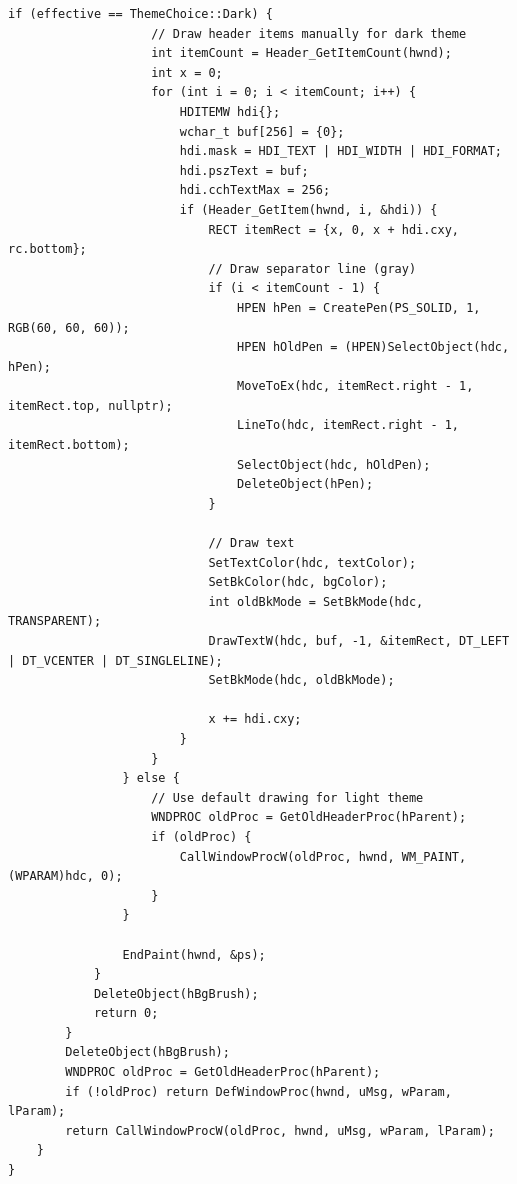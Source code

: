 \begin{lstlisting}[style=CodeListing]
                if (effective == ThemeChoice::Dark) {
                    // Draw header items manually for dark theme
                    int itemCount = Header_GetItemCount(hwnd);
                    int x = 0;
                    for (int i = 0; i < itemCount; i++) {
                        HDITEMW hdi{};
                        wchar_t buf[256] = {0};
                        hdi.mask = HDI_TEXT | HDI_WIDTH | HDI_FORMAT;
                        hdi.pszText = buf;
                        hdi.cchTextMax = 256;
                        if (Header_GetItem(hwnd, i, &hdi)) {
                            RECT itemRect = {x, 0, x + hdi.cxy, rc.bottom};
                            // Draw separator line (gray)
                            if (i < itemCount - 1) {
                                HPEN hPen = CreatePen(PS_SOLID, 1, RGB(60, 60, 60));
                                HPEN hOldPen = (HPEN)SelectObject(hdc, hPen);
                                MoveToEx(hdc, itemRect.right - 1, itemRect.top, nullptr);
                                LineTo(hdc, itemRect.right - 1, itemRect.bottom);
                                SelectObject(hdc, hOldPen);
                                DeleteObject(hPen);
                            }
                            
                            // Draw text
                            SetTextColor(hdc, textColor);
                            SetBkColor(hdc, bgColor);
                            int oldBkMode = SetBkMode(hdc, TRANSPARENT);
                            DrawTextW(hdc, buf, -1, &itemRect, DT_LEFT | DT_VCENTER | DT_SINGLELINE);
                            SetBkMode(hdc, oldBkMode);
                            
                            x += hdi.cxy;
                        }
                    }
                } else {
                    // Use default drawing for light theme
                    WNDPROC oldProc = GetOldHeaderProc(hParent);
                    if (oldProc) {
                        CallWindowProcW(oldProc, hwnd, WM_PAINT, (WPARAM)hdc, 0);
                    }
                }
                
                EndPaint(hwnd, &ps);
            }
            DeleteObject(hBgBrush);
            return 0;
        }
        DeleteObject(hBgBrush);
        WNDPROC oldProc = GetOldHeaderProc(hParent);
        if (!oldProc) return DefWindowProc(hwnd, uMsg, wParam, lParam);
        return CallWindowProcW(oldProc, hwnd, uMsg, wParam, lParam);
    }
}


\end{lstlisting}
